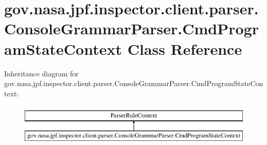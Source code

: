 \hypertarget{classgov_1_1nasa_1_1jpf_1_1inspector_1_1client_1_1parser_1_1_console_grammar_parser_1_1_cmd_program_state_context}{}\section{gov.\+nasa.\+jpf.\+inspector.\+client.\+parser.\+Console\+Grammar\+Parser.\+Cmd\+Program\+State\+Context Class Reference}
\label{classgov_1_1nasa_1_1jpf_1_1inspector_1_1client_1_1parser_1_1_console_grammar_parser_1_1_cmd_program_state_context}
Inheritance diagram for gov.\+nasa.\+jpf.\+inspector.\+client.\+parser.\+Console\+Grammar\+Parser.\+Cmd\+Program\+State\+Context\+:\begin{figure}[H]
\begin{center}
\leavevmode
\includegraphics[height=2.000000cm]{classgov_1_1nasa_1_1jpf_1_1inspector_1_1client_1_1parser_1_1_console_grammar_parser_1_1_cmd_program_state_context}
\end{center}
\end{figure}
